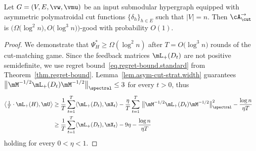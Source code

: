 \documentclass[letterpaper]{article}
\begin{document}
\begin{lemma}
\label{lem.asym-cut-strat.good}
Let $G = (V, E, \vw, \vmu)$ be an input submodular hypergraph equipped with asymmetric polymatroidal cut functions $\{ \delta_h \}_{h \in E}$ such that $\lvert V \rvert = n$. Then $\cA^{\rightarrow}_{\cut}$ is $\Big( \Omega \big( \log^2 n \big), O \big( \log^3 n \big) \Big)$-good with probability $O(1)$.
\end{lemma}
\begin{proof}
We demonstrate that $\Psi^*_H \geq \Omega(\log^2 n)$ after $T = O \big( {\log^3 n} \big)$ rounds of the cut-matching game. Since the feedback matrices $\mL_{+}(D_t)$ are not positive semidefinite, we use regret bound~\eqref{eq.regret-bound.standard} from Theorem~\ref{thm.regret-bound}. Lemma~\ref{lem.asym-cut-strat.width} guarantees $\big\lVert \mM^{-1/2} \mL_{+}(D_t) \mM^{-1/2} \big\rVert_{\spectral} \leq 3$ for every $t > 0$, thus
\begin{align*}
\big\langle \tfrac{1}{T} \cdot \mL_{+}(H), \mU \big\rangle
&\geq \frac{1}{T} \sum_{t=1}^T \langle \mL_{+}(D_t), \mX_t \rangle - \frac{\eta}{T} \sum_{t=1}^T \, \big\lVert \mM^{-1/2} \mL_{+}(D_t) \mM^{-1/2} \big\rVert_{\spectral}^2 - \frac{\log n}{\eta T} \\
&\geq \frac{1}{T} \sum_{t=1}^T \langle \mL_{+}(D_t), \mX_t \rangle - 9 \eta - \frac{\log n}{\eta T}
\end{align*}
holding for every $0 < \eta < 1$.


\end{proof}
\end{document}
